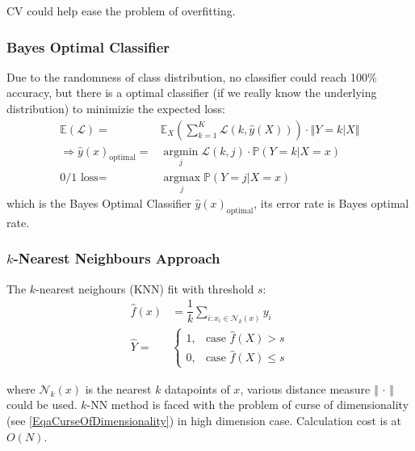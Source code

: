     CV could help ease the problem of overfitting.
    
        

\subsubsection{Bayes Optimal Classifier}

    Due to the randomness of class distribution, no classifier could reach 100\% accuracy, but there is a optimal classifier (if we really know the underlying distribution) to minimizie the expected loss:
    \begin{align}
        \mathbb{E}\left( \mathcal{L} \right)=&\mathbb{E}_X\left( \sum_{k=1}^K\mathcal{L}(k,\hat{y}(X)) \right)\cdot \left\Vert Y=k|X \right\Vert    \\
        \Rightarrow \hat{y}(x)_{\mathrm{optimal} }=&\mathop{\arg\min}\limits_{j} \mathcal{L}(k,j)\cdot\mathbb{P}\left( Y=k|X=x \right)\\
        \text{0/1 loss}=&\mathop{\arg\max}\limits_{j}\mathbb{P}\left( Y=j|X=x \right)   
    \end{align}
    which is the Bayes Optimal Classifier $ \hat{y}(x)_{\mathrm{optimal} } $, its error rate is Bayes optimal rate.
    
    

    

\subsubsection{$ k $-Nearest Neighbours Approach}
    The $ k $-nearest neighours (KNN) fit with threshold $ s $:
    \begin{align}
        \hat{f}(x)&=\dfrac{1}{k}\sum_{i:x_i\in\mathcal{N}_k(x)}y_i \\
        \hat{Y}=&\begin{cases}
            1,&\text{case }\hat{f}(X)>s\\
            0,&\text{case }\hat{f}(X)\leq s
        \end{cases}
    \end{align}

    where $ \mathcal{N}_k(x) $ is the nearest $ k $ datapoints of $ x $, various distance measure $ \left\Vert \,\cdot\, \right\Vert  $ could be used. $ k $-NN method is faced with the problem of curse of dimensionality (see \autoref{EqaCurseOfDimensionality}) in high dimension case. Calculation cost is at $ O(N) $.

